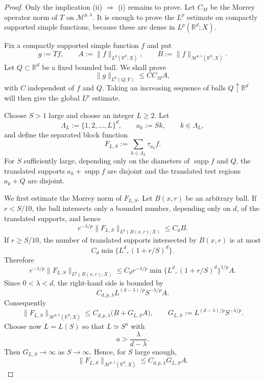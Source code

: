 \documentclass[11pt]{article}
\theoremstyle{definition}
\newcommand{\R}{\mathbb R}
\begin{document}
	\begin{proof}
		Only the implication \textup{(ii)} $\Rightarrow$ \textup{(i)} remains to prove.  Let $C_M$ be the Morrey operator norm of $T$ on $\mathcal M^{p,\lambda}$.  It is enough to prove the $L^p$ estimate on compactly supported simple functions, because these are dense in $L^p(\R^d;X)$.

		Fix a compactly supported simple function $f$ and put
		\[
		g:=Tf,
		\qquad
		A:=\|f\|_{L^p(\R^d;X)},
		\qquad
		B:=\|f\|_{\mathcal M^{p,\lambda}(\R^d;X)}.
		\]
		Let $Q\subset\R^d$ be a fixed bounded ball.  We shall prove
		\[
		\|g\|_{L^p(Q;Y)}\le C C_M A,
		\]
		with $C$ independent of $f$ and $Q$.  Taking an increasing sequence of balls $Q\uparrow\R^d$ will then give the global $L^p$ estimate.

		Choose $S>1$ large and choose an integer $L\ge2$.  Let
		\[
		\Lambda_L:=\{1,2,\dots,L\}^d,
		\qquad
		a_k:=S k,
		\qquad k\in\Lambda_L,
		\]
		and define the separated block function
		\[
		F_{L,S}:=\sum_{k\in\Lambda_L}\tau_{a_k}f.
		\]
		For $S$ sufficiently large, depending only on the diameters of $\operatorname{supp}f$ and $Q$, the translated supports $a_k+\operatorname{supp}f$ are disjoint and the translated test regions $a_k+Q$ are disjoint.

		We first estimate the Morrey norm of $F_{L,S}$.  Let $B(x,r)$ be an arbitrary ball.  If $r<S/10$, the ball intersects only a bounded number, depending only on $d$, of the translated supports, and hence
		\[
		r^{-\lambda/p}\|F_{L,S}\|_{L^p(B(x,r);X)}\le C_d B.
		\]
		If $r\ge S/10$, the number of translated supports intersected by $B(x,r)$ is at most
		\[
		C_d\min\{L^d,(1+r/S)^d\}.
		\]
		Therefore
		\[
		r^{-\lambda/p}\|F_{L,S}\|_{L^p(B(x,r);X)}
		\le
		C_d r^{-\lambda/p}\min\{L^d,(1+r/S)^d\}^{1/p}A.
		\]
		Since $0<\lambda<d$, the right-hand side is bounded by
		\[
		C_{d,p,\lambda} L^{(d-\lambda)/p}S^{-\lambda/p}A.
		\]
		Consequently
		\[
		\|F_{L,S}\|_{\mathcal M^{p,\lambda}(\R^d;X)}
		\le
		C_{d,p,\lambda}\bigl(B+G_{L,S}A\bigr),
		\qquad
		G_{L,S}:=L^{(d-\lambda)/p}S^{-\lambda/p}.
		\]
		Choose now $L=L(S)$ so that $L\simeq S^a$ with
		\[
		a>\frac{\lambda}{d-\lambda}.
		\]
		Then $G_{L,S}\to\infty$ as $S\to\infty$.  Hence, for $S$ large enough,
		\[
		\|F_{L,S}\|_{\mathcal M^{p,\lambda}(\R^d;X)}
		\le
		C_{d,p,\lambda}G_{L,S}A.
		\]


\end{proof}
\end{document}
